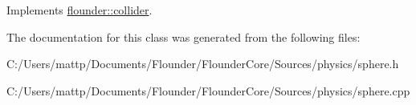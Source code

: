 Implements \hyperlink{classflounder_1_1collider_a87949f913283dcedab16b8bdfb73e8fa}{flounder\+::collider}.



The documentation for this class was generated from the following files\+:\begin{DoxyCompactItemize}
\item 
C\+:/\+Users/mattp/\+Documents/\+Flounder/\+Flounder\+Core/\+Sources/physics/sphere.\+h\item 
C\+:/\+Users/mattp/\+Documents/\+Flounder/\+Flounder\+Core/\+Sources/physics/sphere.\+cpp\end{DoxyCompactItemize}
